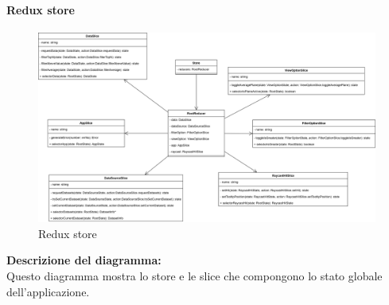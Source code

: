 \paragraph{Redux store}
\begin{figure}[h!] \centering
    \includegraphics[scale=0.17]{template/images/uml_front/logic/Store.png}
    \caption{Redux store}
\end{figure}
\textbf{Descrizione del diagramma:}\\
Questo diagramma mostra lo store e le slice che compongono lo stato globale dell'applicazione.
